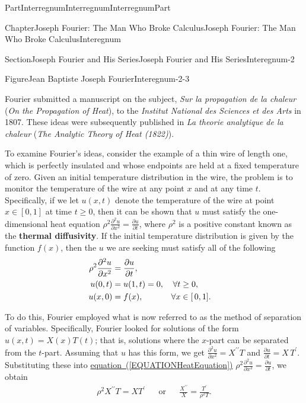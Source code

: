\documentclass[oneside,10pt,]{book}
\newcommand{\xreffont}{\relax}
\newcommand{\terminology}[1]{\textbf{#1}}
\newcommand{\pubtitle}[1]{\textsl{#1}}
\numberwithin{equation}{part}
\newcommand{\amp}{&}
\begin{document}
\begin{partptx}{Part}{Interregnum}{}{Interregnum}{}{}{InterregnumPart}
\begin{chapterptx}{Chapter}{Joseph Fourier: The Man Who Broke Calculus}{}{Joseph Fourier: The Man Who Broke Calculus}{}{}{Interegnum}
\begin{sectionptx}{Section}{Joseph Fourier and His Series}{}{Joseph Fourier and His Series}{}{}{Interegnum-2}
\begin{figureptx}{Figure}{Jean Baptiste Joseph Fourier}{Interegnum-2-3}{}
\begin{image}{0.325}{0.35}{0.325}{}
\end{image}%
\tcblower
\end{figureptx}%
 Fourier submitted a manuscript on the subject, \textit{Sur la propagation de la chaleur} (\pubtitle{On the Propagation of Heat}), to the \textit{Institut National des Sciences et des Arts} in 1807.  These ideas were subsequently published in \textit{La theorie analytique de la chaleur} (\pubtitle{The Analytic Theory of Heat (1822)}).%
\par
To examine Fourier's ideas, consider the example of a thin wire of length one, which is perfectly insulated and whose endpoints are held at a fixed temperature of zero.  Given an initial temperature distribution in the wire, the problem is to monitor the temperature of the wire at any point \(x\) and at any time \(t\).  Specifically, if we let \(u(x,t)\) denote the temperature of the wire at point \(x\in[0,1]\) at time \(t\geq 0\), then it can be shown that \(u\) must satisfy the one-dimensional heat equation \(\rho^2\frac{\partial^2u}{\partial x^2}=\frac{\partial
u}{\partial t}\), where \(\rho^2\) is a positive constant known as the \terminology{thermal diffusivity}.  If the initial temperature distribution is given by the function \(f(x)\), then the \(u\) we are seeking must satisfy all of the following%
\begin{align}
\rho^2\frac{\partial^2u}{\partial x^2}\amp{}=\frac{\partial u}{\partial t},\amp{}\label{EQUATIONHeatEquation}\\
u(0,t)\amp{} =u(1,t)=0,  
\amp{}
\forall t\amp{}\geq 0,\notag\\
u(x,0)\amp{} =f(x), 
\amp{}
\forall x\amp{}\in[\,0,1].\notag
\end{align}
%
\par
To do this, Fourier employed what is now referred to as the method of separation of variables.  Specifically, Fourier looked for solutions of the form \(u(x,t)=X(x)T(t)\); that is, solutions where the \(x\)-part can be separated from the \(t\)-part.  Assuming that \(u\) has this form, we get \(\frac{\partial^2u}{\partial x^2}=X^{\prime\prime}T\) and \(\frac{\partial u}{\partial t}=X\,T^{\prime}\).  Substituting these into \hyperref[EQUATIONHeatEquation]{equation~({\xreffont\ref{EQUATIONHeatEquation}})} \(\rho^2\frac{\partial^2u}{\partial x^2}=\frac{\partial
u}{\partial t}\), we obtain%
\begin{align*}
\rho^2X^{\prime\prime}T=X
T^\prime\amp{}\amp{}\text{or}\amp{}\amp{}
\frac{X^{\prime\prime}}{X}=\frac{T^\prime}{\rho^2T}\text{.}

\end{align*}
\end{sectionptx}
\end{chapterptx}
\end{partptx}
\end{document}
